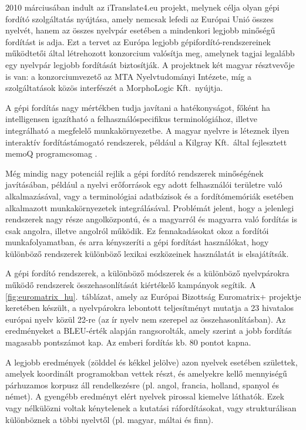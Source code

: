 \begin{multicols}{2}
2010 márciusában indult az iTranslate4.eu \cite{it4eu} projekt, melynek célja olyan gépi fordító szolgáltatás nyújtása, amely nemcsak lefedi az Európai Unió összes nyelvét, hanem az összes nyelvpár esetében a mindenkori legjobb minőségű fordítást is adja. Ezt a tervet az Európa legjobb gépifordító-rendszereinek működtetői által létrehozott konzorcium valósítja meg, amelynek tagjai legalább egy nyelvpár legjobb fordítását biztosítják. A projektnek két magyar résztvevője is van: a konzorciumvezető az MTA Nyelvtudományi Intézete, míg a szolgáltatások közös interfészét a MorphoLogic Kft.\ nyújtja. 

A gépi fordítás nagy mértékben tudja javítani a hatékonyságot, főként ha intelligensen igazítható a felhasználóspecifikus terminológiához, illetve integrálható a megfelelő munkakörnyezetbe. A ma\-gyar nyelvre is léteznek ilyen interaktív fordítástámogató rendszerek, például a Kilgray Kft.\ által fejlesztett memoQ prog\-ram\-cso\-mag \cite{memoq}. 

Még mindig nagy potenciál rejlik a gépi fordító rendszerek minőségének ja\-ví\-tá\-sá\-ban, például a nyelvi erőforrások egy adott felhasználói területre való alkalmazásával, vagy a terminológiai adatbázisok és a fordítómemóriák esetében alkalmazott munkakörnyezetek integrálásával. Problémát jelent, hogy a jelenlegi rendszerek nagy része angolközpontú, és a magyarról és magyarra való fordítás is csak angolra, illetve angolról működik. Ez fennakadásokat okoz a fordítói munkafolyamatban, és arra kényszeríti a gépi fordítást használókat, hogy különböző rendszerek különböző lexikai eszközeinek használatát is elsajátítsák.

A gépi fordító rendszerek, a különböző módszerek és a különböző nyelvpárokra működő rendszerek összehasonlítását ki\-ér\-té\-ke\-lő kampányok segítik. A \ref{fig:euromatrix_hu}.~táblázat, amely az Európai Bizottság Euromatrix+ projektje keretében készült, a nyelvpárokra lebontott teljesítményt mutatja a 23 hivatalos európai nyelv közül 22-re (az ír nyelv nem szerepel az összehasonlításban). Az eredményeket a BLEU-érték \cite{bleu1} alapján rangsorolták, amely szerint a jobb fordítás magasabb pontszámot kap. Az emberi fordítás kb. 80 pontot kapna.

A legjobb eredmények (zölddel és kékkel jelölve) azon nyelvek esetében születtek, amelyek koordinált programokban vettek részt, és amelyekre kellő mennyiségű párhuzamos korpusz áll rendelkezésre (pl. angol, francia, holland, spanyol és német). A gyengébb eredményt elért nyelvek pi\-ros\-sal kiemelve láthatók. Ezek vagy nélkülözni voltak kénytelenek a kutatási ráfordításokat, vagy strukturálisan különböznek a többi nyelvtől (pl. magyar, máltai és finn).


\end{multicols}
